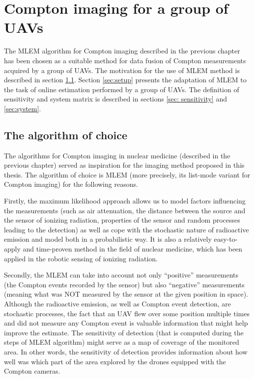 \chapter{Compton imaging for a group of UAVs\label{chap:methods_estimation}}
The \ac{MLEM} algorithm for Compton imaging described in the previous chapter has been chosen as a suitable method for data fusion of Compton measurements acquired by a group of \ac{UAV}s.
The motivation for the use of \ac{MLEM} method is described in section \ref{sec:prelim}.
Section \ref{sec:setup} presents the adaptation of \ac{MLEM} to the task of online estimation performed by a group of \ac{UAV}s.
The definition of sensitivity and system matrix is described in sections \ref{sec: sensitivity} and \ref{sec:system}.

\section{The algorithm of choice}
\label{sec:prelim}
The algorithms for Compton imaging in nuclear medicine (described in the previous chapter) served as inspiration for the imaging method proposed in this thesis.
The algorithm of choice is \acf{MLEM} (more precisely, its list-mode variant for Compton imaging) for the following reasons.

Firstly, the maximum likelihood approach allows us to model factors influencing the measurements (such as air attenuation, the distance between the source and the sensor of ionizing radiation,  properties of the sensor and random processes leading to the detection)
as well as cope with the stochastic nature of radioactive emission and model both in a probabilistic way.
It is also a relatively easy-to-apply and time-proven method in the field of nuclear medicine, which has been applied in the robotic sensing of ionizing radiation.

Secondly, the \ac{MLEM} can take into account not only ``positive'' measurements (the Compton events recorded by the sensor) but also ``negative'' measurements (meaning what was NOT measured by the sensor at the given position in space).
Although the radioactive emission, as well as Compton event detection, are stochastic processes, the fact that an \ac{UAV} flew over some position multiple times and did not measure any Compton event is valuable information that might help improve the estimate.
The sensitivity of detection (that is computed during the steps of \ac{MLEM} algorithm) might serve as a map of coverage of the monitored area.
In other words, the sensitivity of detection provides information about how well was which part of the area explored by the drones equipped with the Compton cameras.

